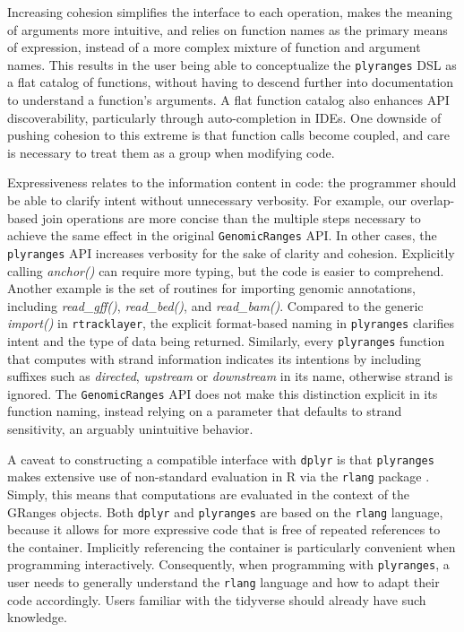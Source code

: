 \documentclass[]{article}
\begin{document}
Increasing cohesion simplifies the interface to each operation, makes
the meaning of arguments more intuitive, and relies on function names as
the primary means of expression, instead of a more complex mixture of
function and argument names. This results in the user being able to
conceptualize the \texttt{plyranges} DSL as a flat catalog of functions,
without having to descend further into documentation to understand a
function's arguments. A flat function catalog also enhances API
discoverability, particularly through auto-completion in IDEs. One
downside of pushing cohesion to this extreme is that function calls
become coupled, and care is necessary to treat them as a group when
modifying code.

Expressiveness relates to the information content in code: the
programmer should be able to clarify intent without unnecessary
verbosity. For example, our overlap-based join operations are more
concise than the multiple steps necessary to achieve the same effect in
the original \texttt{GenomicRanges} API. In other cases, the
\texttt{plyranges} API increases verbosity for the sake of clarity and
cohesion. Explicitly calling \emph{anchor()} can require more typing,
but the code is easier to comprehend. Another example is the set of
routines for importing genomic annotations, including
\emph{read\_gff()}, \emph{read\_bed()}, and \emph{read\_bam()}. Compared
to the generic \emph{import()} in \texttt{rtracklayer}, the explicit
format-based naming in \texttt{plyranges} clarifies intent and the type
of data being returned. Similarly, every \texttt{plyranges} function
that computes with strand information indicates its intentions by
including suffixes such as \emph{directed}, \emph{upstream} or
\emph{downstream} in its name, otherwise strand is ignored. The
\texttt{GenomicRanges} API does not make this distinction explicit in
its function naming, instead relying on a parameter that defaults to
strand sensitivity, an arguably unintuitive behavior.

A caveat to constructing a compatible interface with \texttt{dplyr} is
that \texttt{plyranges} makes extensive use of non-standard evaluation
in R via the \texttt{rlang} package \cite{R-rlang}. Simply, this means
that computations are evaluated in the context of the GRanges objects.
Both \texttt{dplyr} and \texttt{plyranges} are based on the
\texttt{rlang} language, because it allows for more expressive code that
is free of repeated references to the container. Implicitly referencing
the container is particularly convenient when programming interactively.
Consequently, when programming with \texttt{plyranges}, a user needs to
generally understand the \texttt{rlang} language and how to adapt their
code accordingly. Users familiar with the tidyverse should already have
such knowledge.
\end{document}
